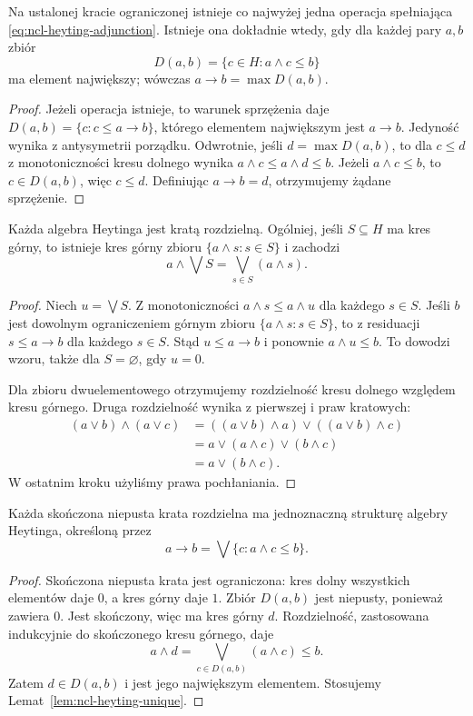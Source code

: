 \begin{lemat}
\label{lem:ncl-heyting-unique}
Na ustalonej kracie ograniczonej istnieje co
najwyżej jedna operacja spełniająca
\eqref{eq:ncl-heyting-adjunction}. Istnieje ona
dokładnie wtedy, gdy dla każdej pary $a,b$
zbiór
\[
 D(a,b)=\{c\in H:a\wedge c\leq b\}
\]
ma element największy; wówczas $a\to b=\max D(a,b)$.
\end{lemat}
\begin{proof}
Jeżeli operacja istnieje, to warunek sprzężenia
daje $D(a,b)=\{c:c\leq a\to b\}$, którego
elementem największym jest $a\to b$.
Jedyność wynika z antysymetrii porządku.
Odwrotnie, jeśli $d=\max D(a,b)$, to dla
$c\leq d$ z monotoniczności kresu dolnego
wynika $a\wedge c\leq a\wedge d\leq b$.
Jeżeli $a\wedge c\leq b$, to $c\in D(a,b)$,
więc $c\leq d$. Definiując $a\to b=d$,
otrzymujemy żądane sprzężenie.
\end{proof}

\begin{twierdzenie}
\label{thm:ncl-heyting-distributivity}
Każda algebra Heytinga jest kratą rozdzielną.
Ogólniej, jeśli $S\subseteq H$ ma kres górny,
to istnieje kres górny zbioru
$\{a\wedge s:s\in S\}$ i zachodzi
\[
 a\wedge\bigvee S=\bigvee_{s\in S}(a\wedge s).
\]
\end{twierdzenie}
\begin{proof}
Niech $u=\bigvee S$. Z monotoniczności
$a\wedge s\leq a\wedge u$ dla każdego $s\in S$.
Jeśli $b$ jest dowolnym ograniczeniem górnym
zbioru $\{a\wedge s:s\in S\}$, to z residuacji
$s\leq a\to b$ dla każdego $s\in S$.
Stąd $u\leq a\to b$ i ponownie
$a\wedge u\leq b$. To dowodzi wzoru, także
dla $S=\varnothing$, gdy $u=0$.

Dla zbioru dwuelementowego otrzymujemy rozdzielność
kresu dolnego względem kresu górnego.
Druga rozdzielność wynika z pierwszej i praw
kratowych:
\[
\begin{aligned}
 (a\vee b)\wedge(a\vee c)
 &=((a\vee b)\wedge a)\vee((a\vee b)\wedge c)\\
 &=a\vee(a\wedge c)\vee(b\wedge c)\\
 &=a\vee(b\wedge c).
\end{aligned}
\]
W ostatnim kroku użyliśmy prawa pochłaniania.
\end{proof}

\begin{twierdzenie}
\label{thm:ncl-heyting-finite-distributive}
Każda skończona niepusta krata rozdzielna ma
jednoznaczną strukturę algebry Heytinga, określoną
przez
\[
 a\to b=\bigvee\{c:a\wedge c\leq b\}.
\]
\end{twierdzenie}
\begin{proof}
Skończona niepusta krata jest ograniczona:
kres dolny wszystkich elementów daje $0$,
a kres górny daje $1$.
Zbiór $D(a,b)$ jest niepusty, ponieważ zawiera $0$.
Jest skończony, więc ma kres górny $d$.
Rozdzielność, zastosowana indukcyjnie do
skończonego kresu górnego, daje
\[
 a\wedge d=\bigvee_{c\in D(a,b)}(a\wedge c)\leq b.
\]
Zatem $d\in D(a,b)$ i jest jego największym
elementem. Stosujemy
Lemat~\ref{lem:ncl-heyting-unique}.
\end{proof}

